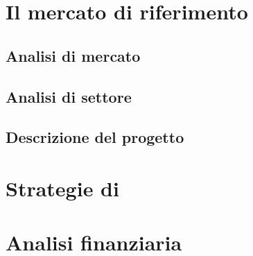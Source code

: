 \section{Il mercato di riferimento}\label{sec:whattheproblemis}
\subsection{Analisi di mercato}


\subsection{Analisi di settore}

\subsection{Descrizione del progetto}

\section{Strategie di \mktg}\label{sec:exitstrategy}

\section{Analisi finanziaria}

